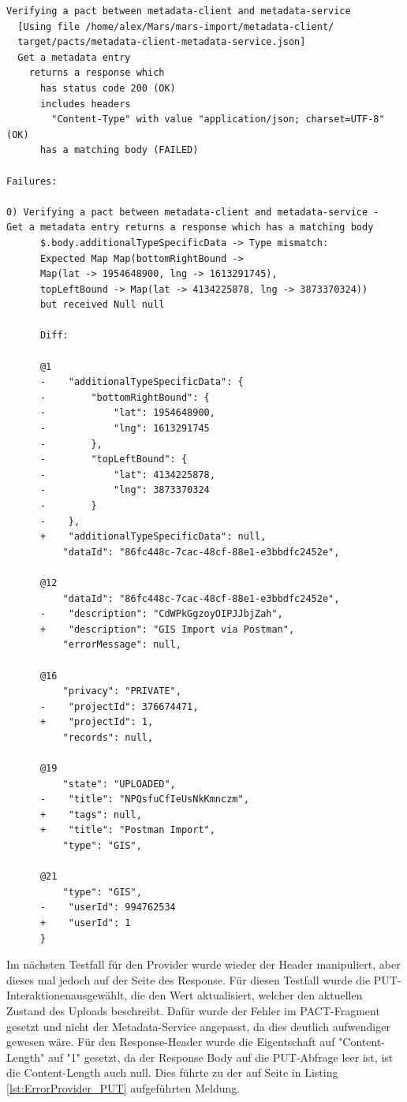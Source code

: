 \documentclass{llncs}
\begin{document}
\lstset{language = Java}
\begin{lstlisting}[caption=Test,label={lst:ErrorProvider_GET}]
Verifying a pact between metadata-client and metadata-service
  [Using file /home/alex/Mars/mars-import/metadata-client/
  target/pacts/metadata-client-metadata-service.json]
  Get a metadata entry
    returns a response which
      has status code 200 (OK)
      includes headers
        "Content-Type" with value "application/json; charset=UTF-8" (OK)
      has a matching body (FAILED)

Failures:

0) Verifying a pact between metadata-client and metadata-service - 
Get a metadata entry returns a response which has a matching body
      $.body.additionalTypeSpecificData -> Type mismatch: 
      Expected Map Map(bottomRightBound -> 
      Map(lat -> 1954648900, lng -> 1613291745), 
      topLeftBound -> Map(lat -> 4134225878, lng -> 3873370324)) 
      but received Null null

      Diff:

      @1
      -    "additionalTypeSpecificData": {
      -        "bottomRightBound": {
      -            "lat": 1954648900,
      -            "lng": 1613291745
      -        },
      -        "topLeftBound": {
      -            "lat": 4134225878,
      -            "lng": 3873370324
      -        }
      -    },
      +    "additionalTypeSpecificData": null,
          "dataId": "86fc448c-7cac-48cf-88e1-e3bbdfc2452e",
      
      @12
          "dataId": "86fc448c-7cac-48cf-88e1-e3bbdfc2452e",
      -    "description": "CdWPkGgzoyOIPJJbjZah",
      +    "description": "GIS Import via Postman",
          "errorMessage": null,
      
      @16
          "privacy": "PRIVATE",
      -    "projectId": 376674471,
      +    "projectId": 1,
          "records": null,
      
      @19
          "state": "UPLOADED",
      -    "title": "NPQsfuCfIeUsNkKmnczm",
      +    "tags": null,
      +    "title": "Postman Import",
          "type": "GIS",
      
      @21
          "type": "GIS",
      -    "userId": 994762534
      +    "userId": 1
      }
\end{lstlisting}

Im nächsten Testfall für den Provider wurde wieder der Header manipuliert, aber dieses mal jedoch auf der Seite des Response. Für diesen Testfall wurde die PUT-Interaktionenausgewählt, die den Wert aktualisiert, welcher den aktuellen Zustand des Uploads beschreibt. Dafür wurde der Fehler im PACT-Fragment gesetzt und nicht der Metadata-Service angepasst, da dies deutlich aufwendiger gewesen wäre. Für den Response-Header wurde die Eigentschaft auf "Content-Length" auf "1" gesetzt, da der Response Body auf die PUT-Abfrage leer ist, ist die Content-Length auch null. Dies führte zu der auf Seite \pageref{lst:ErrorProvider_PUT} in Listing \ref{lst:ErrorProvider_PUT} aufgeführten Meldung.
\end{document}
